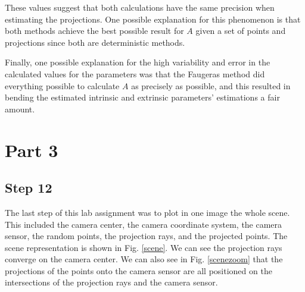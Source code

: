 \documentclass[journal]{IEEEtran}
\begin{document}
These values suggest that both calculations have the same precision when estimating the projections. One possible explanation for this phenomenon is that both methods achieve the best possible result for $A$ given a set of points and projections since both are deterministic methods.

Finally, one possible explanation for the high variability and error in the calculated values for the parameters was that the Faugeras method did everything possible to calculate $A$ as precisely as possible, and this resulted in bending the estimated intrinsic and extrinsic parameters' estimations a fair amount.

\section{Part 3}\label{p3}

\subsection{Step 12}

The last step of this lab assignment was to plot in one image the whole scene. This included the camera center, the camera coordinate system, the camera sensor, the random points, the projection rays, and the projected points. The scene representation is shown in Fig. \ref{scene}. We can see the projection rays converge on the camera center. We can also see in Fig. \ref{scenezoom} that the projections of the points onto the camera sensor are all positioned on the intersections of the projection rays and the camera sensor.
\end{document}
